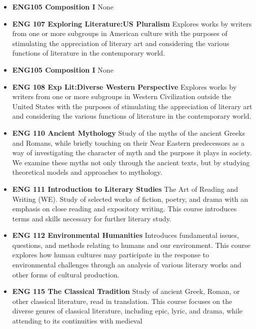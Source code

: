\documentclass[
  letterpaper,
]{scrbook}
\providecommand{\tightlist}{%
  \setlength{\itemsep}{0pt}\setlength{\parskip}{0pt}}
\begin{document}
\begin{itemize}
\tightlist
\item
  \textbf{ENG105 Composition I} None\\
\item
  \textbf{ENG 107 Exploring Literature:US Pluralism} Explores works by
  writers from one or more subgroups in American culture with the
  purposes of stimulating the appreciation of literary art and
  considering the various functions of literature in the contemporary
  world.\\
\item
  \textbf{ENG105 Composition I} None\\
\item
  \textbf{ENG 108 Exp Lit:Diverse Western Perspective} Explores works by
  writers from one or more subgroups in Western Civilization outside the
  United States with the purposes of stimulating the appreciation of
  literary art and considering the various functions of literature in
  the contemporary world.\\
\item
  \textbf{ENG 110 Ancient Mythology} Study of the myths of the ancient
  Greeks and Romans, while briefly touching on their Near Eastern
  predecessors as a way of investigating the character of myth and the
  purpose it plays in society. We examine these myths not only through
  the ancient texts, but by studying theoretical models and approaches
  to mythology.\\
\item
  \textbf{ENG 111 Introduction to Literary Studies} The Art of Reading
  and Writing (WE). Study of selected works of fiction, poetry, and
  drama with an emphasis on close reading and expository writing. This
  course introduces terms and skills necessary for further literary
  study.\\
\item
  \textbf{ENG 112 Environmental Humanities} Introduces fundamental
  issues, questions, and methods relating to humans and our environment.
  This course explores how human cultures may participate in the
  response to environmental challenges through an analysis of various
  literary works and other forms of cultural production.\\
\item
  \textbf{ENG 115 The Classical Tradition} Study of ancient Greek,
  Roman, or other classical literature, read in translation. This course
  focuses on the diverse genres of classical literature, including epic,
  lyric, and drama, while attending to its continuities with medieval

\end{itemize}
\end{document}
